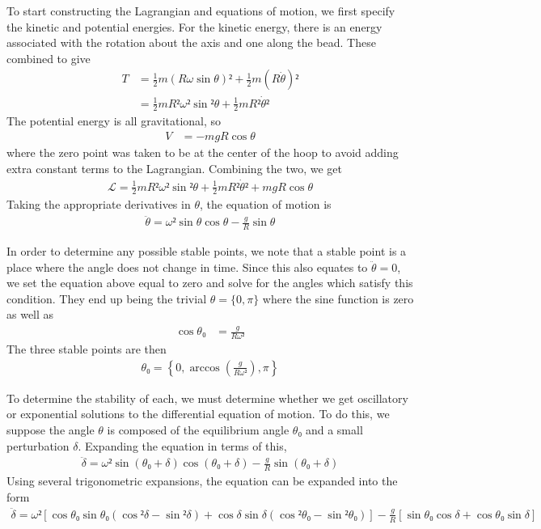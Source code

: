 To start constructing the Lagrangian and equations of motion, we first specify
the kinetic and potential energies. For the kinetic energy, there is an energy
associated with the rotation about the axis and one along the bead. These
combined to give
\begin{align*}
    T &= \frac 12 m (Rω\sin θ)² + \frac 12 m (R\dot θ)² \\
    {} &= \frac 12 m R² ω² \sin² θ + \frac 12 m R² {\dot θ}²
\end{align*}
The potential energy is all gravitational, so
\begin{align*}
    V &= -mgR\cos θ
\end{align*}
where the zero point was taken to be at the center of the hoop to avoid adding
extra constant terms to the Lagrangian. Combining the two, we get
\begin{align}
    \boxed{
    \mathcal L = \frac 12 mR²ω²\sin² θ + \frac 12 mR²{\dot θ}² + mgR\cos θ
    }
\end{align}
Taking the appropriate derivatives in $θ$, the equation of motion is
\begin{align}
    \boxed{
    \ddot θ = ω² \sin θ \cos θ - \frac{g}{R}\sin θ
    }
\end{align}

In order to determine any possible stable points, we note that a stable point
is a place where the angle does not change in time. Since this also equates to
$\ddot θ = 0$, we set the equation above equal to zero and solve for the angles
which satisfy this condition. They end up being the trivial $θ = \{0, π\}$
where the sine function is zero as well as
\begin{align*}
    \cos θ₀ &= \frac{g}{Rω²}
\end{align*}
The three stable points are then
\begin{align}
    \boxed{ θ₀ = \left\{ 0, \arccos(\frac{g}{Rω²}), π \right\} }
\end{align}

To determine the stability of each, we must determine whether we get
oscillatory or exponential solutions to the differential equation of motion.
To do this, we suppose the angle $θ$ is composed of the equilibrium angle
$θ₀$ and a small perturbation $δ$. Expanding the equation in terms of this,
\begin{align*}
    \ddot δ = ω²\sin(θ₀+δ)\cos(θ₀+δ) - \frac{g}{R}\sin(θ₀+δ)
\end{align*}
Using several trigonometric expansions, the equation can be expanded into the
form
\begin{align*}
    \ddot δ = ω²\left[ \cos θ₀\sin θ₀ (\cos²δ - \sin²δ) + \cos δ\sin δ
        (\cos²θ₀ - \sin²θ₀) \right] - \frac{g}{R}\left[ \sin θ₀\cos δ +
        \cos θ₀\sin δ \right]   
\end{align*}

